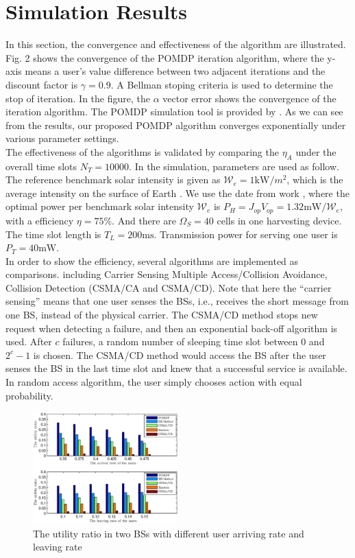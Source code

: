 \documentclass[conference]{IEEEtran}
\begin{document}
\section{Simulation Results}
In this section, the convergence and effectiveness of the algorithm are illustrated.
Fig. 2 shows the convergence of the POMDP iteration algorithm, where the y-axis means a user's value difference between two adjacent iterations and the discount factor is \(\gamma = 0.9\).
A Bellman stoping criteria is used to determine the stop of iteration.
In the figure, the \(\alpha\) vector error shows the convergence of the iteration algorithm.
The POMDP simulation tool is provided by \cite{pomdptool}.
As we can see from the results, our proposed POMDP algorithm converges exponentially under various parameter settings.\\
\indent The effectiveness of the algorithms is validated by comparing the \(\eta_A\)
under the overall time slots \(N_T = 10000\).
In the simulation, parameters are used as follow.
The reference benchmark solar intensity is given as \(\mathcal{W}_e = 1\mbox{kW}/m^2\),
which is the average intensity on the surface of Earth \cite{electric}.
We use the date from work \cite{circuit}, where the optimal power per benchmark solar intensity \(\mathcal{W}_e\)
is \(P_H = J_{op}V_{op} = 1.32\mbox{mW}/\mathcal{W}_e\), with a efficiency \(\eta = 75 \%\).
And there are \(\Omega_S = 40\) cells in one harvesting device.
The time slot length is \(T_L = 200\mbox{ms}\).
Transmission power for serving one user is \(P_T = 40\mbox{mW}\).\\
\indent In order to show the efficiency, several algorithms are implemented as comparisons.
including Carrier Sensing Multiple Access/Collision Avoidance, Collision Detection (CSMA/CA and CSMA/CD).
Note that here the ``carrier sensing'' means that one user senses the BSs, i.e., receives the short message from one BS, instead of the physical carrier.
The CSMA/CD method stops new request when detecting a failure, and then an exponential back-off algorithm is used.
After \(c\) failures, a random number of sleeping time slot between \(0\) and \(2^c - 1\) is chosen.
The CSMA/CD method would access the BS after the user senses the BS in the last time slot
and knew that a successful service is available.
In random access algorithm, the user simply chooses action with equal probability.\\
\begin{figure}[t]
\centering
\includegraphics[width=0.5\textwidth]{4_fig2.eps}
\caption{The utility ratio in two BSs with different user arriving rate and leaving rate}
\end{figure}
\end{document}
